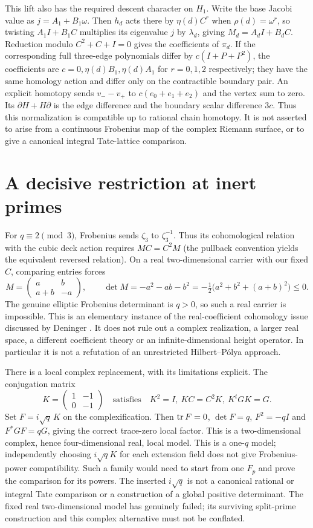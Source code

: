 This lift also has the required descent character on $H_1$. Write the base Jacobi value as $j=A_1+B_1\omega$. Then $h_d$ acts there by $\eta(d)C^r$ when $\rho(d)=\omega^r$, so twisting $A_1I+B_1C$ multiplies its eigenvalue $j$ by $\lambda_d$, giving $M_d=A_dI+B_dC$. Reduction modulo $C^2+C+I=0$ gives the coefficients of $\pi_d$. If the corresponding full three-edge polynomials differ by $c(I+P+P^2)$, the coefficients are $c=0,\eta(d)B_1,\eta(d)A_1$ for $r=0,1,2$ respectively; they have the same homology action and differ only on the contractible boundary pair. An explicit homotopy sends $v_--v_+$ to $c(e_0+e_1+e_2)$ and the vertex sum to zero. Its $\partial H+H\partial$ is the edge difference and the boundary scalar difference $3c$. Thus this normalization is compatible up to rational chain homotopy. It is not asserted to arise from a continuous Frobenius map of the complex Riemann surface, or to give a canonical integral Tate-lattice comparison.

\section{A decisive restriction at inert primes}
For $q\equiv2\pmod3$, Frobenius sends $\zeta_3$ to $\zeta_3^{-1}$. Thus its cohomological relation with the cubic deck action requires $MC=C^2M$ (the pullback convention yields the equivalent reversed relation). On a real two-dimensional carrier with our fixed $C$, comparing entries forces
\[
 M=\begin{pmatrix}a&b\\a+b&-a\end{pmatrix},\qquad
 \det M=-a^2-ab-b^2
 =-\tfrac12\bigl(a^2+b^2+(a+b)^2\bigr)\le0.
\]
The genuine elliptic Frobenius determinant is $q>0$, so such a real carrier is impossible. This is an elementary instance of the real-coefficient cohomology issue discussed by Deninger \cite{DeningerReal}. It does not rule out a complex realization, a larger real space, a different coefficient theory or an infinite-dimensional height operator. In particular it is not a refutation of an unrestricted Hilbert--P\'olya approach.

There is a local complex replacement, with its limitations explicit. The conjugation matrix
\[
 K=\begin{pmatrix}1&-1\\0&-1\end{pmatrix}
 \quad\text{satisfies}\quad K^2=I,\ KC=C^2K,\ K^tGK=G.
\]
Set $F=i\sqrt q\,K$ on the complexification. Then $\operatorname{tr} F=0$, $\det F=q$, $F^2=-qI$ and $F^*GF=qG$, giving the correct trace-zero local factor. This is a two-dimensional complex, hence four-dimensional real, local model. This is a one-$q$ model; independently choosing $i\sqrt q K$ for each extension field does not give Frobenius-power compatibility. Such a family would need to start from one $F_p$ and prove the comparison for its powers. The inserted $i\sqrt q$ is not a canonical rational or integral Tate comparison or a construction of a global positive determinant. The fixed real two-dimensional model has genuinely failed; its surviving split-prime construction and this complex alternative must not be conflated.

